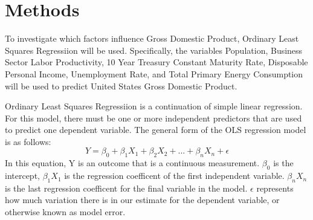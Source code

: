 \documentclass[12pt]{article}
\begin{document}
\section*{Methods}
To investigate which factors influence Gross Domestic Product, Ordinary Least Squares Regressiion will be used. 
Specifically, the variables Population, Business Sector Labor Productivity, 10 Year Treasury Constant Maturity Rate, Disposable Personal Income, Unemployment Rate, and Total Primary Energy Consumption will be used to predict United States Gross Domestic Product.

Ordinary Least Squares Regressiion is a continuation of simple linear regression. 
For this model, there must be one or more independent predictors that are used to predict one dependent variable. 
The general form of the OLS regression model is as follows: 
\begin{equation}
  Y = \beta_0 + \beta_1 X_1 + \beta_2 X_2 + ... + \beta_n X_n + \epsilon
\end{equation}
In this equation, Y is an outcome that is a continuous measurement. $\beta_0$ is the intercept, $\beta_1 X_1$ is the regression coefficent of the first independent variable. 
$\beta_n X_n$ is the last regression coefficent for the final variable in the model.
$\epsilon$ represents how much variation there is in our estimate for the dependent variable, or otherwise known as model error. 
\end{document}
